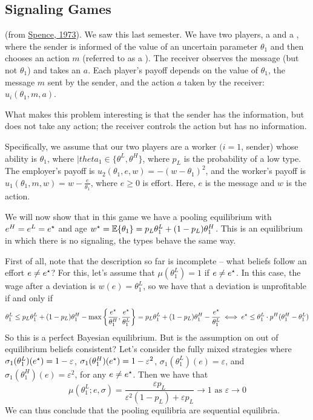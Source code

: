 \documentclass[10pt]{article}
\begin{document}
\subsection{Signaling Games}

\begin{example}
	 (from \href{https://www.jstor.org/stable/1882010}{Spence, 1973}). We saw this last semester. We have two players, a  and a , where the sender is informed of the value of an uncertain parameter $\theta_1$ and then chooses an action $m$ (referred to as a ). The receiver observes the message (but not $\theta_1$) and takes an  $a$. Each player's payoff depends on the value of $\theta_1$, the message $m$ sent by the sender, and the action $a$ taken by the receiver: $u_i(\theta_1,m,a)$. 
	
	\begin{remark}
		What makes this problem interesting is that the sender has the information, but does not take any action; the receiver controls the action but has no information.
	\end{remark}
	
	Specifically, we assume that our two players are a worker $(i=1$, sender) whose ability is $\theta_1$, where $|theta_1 \in \{\theta^L,\theta^H\}$, where $p_L$ is the probability of a low type. The employer's payoff is $u_2(\theta_1,e,w) = -(w-\theta_1)^2$, and the worker's payoff is $u_1(\theta_1,m,w) = w - \frac{e}{\theta_1}$, where $e \ge 0$ is effort. Here, $e$ is the message and $w$ is the action. 
	
	We will now show that in this game we have a pooling equilibrium with $e^H = e^L = e^\star$ and age $w^\star = \mathbb{E}\{\theta_1\} = p_L \theta_1^L + (1-p_L)\theta_1^H$. This is an equilibrium in which there is no signaling, the types behave the same way. 
	
	First of all, note that the description so far is incomplete -- what beliefs follow an effort $e \ne e^\star$? For this, let's assume that $\mu(\theta_1^L) = 1$ if $e \ne e^\star$. In this case, the wage after a deviation is $w(e) =\theta_1^L$, so we have that a deviation is unprofitable if and only if\[\theta_1^L \le p_L\theta_1^L + (1-p_L) \theta_1^H - \max\left\{ \frac{e^\star}{\theta_1^H},\frac{e^\star}{\theta_1^L}\right\} = p_L\theta_1^L + (1-p_L)\theta_1^H - \frac{e^\star}{\theta_1^L} \iff e^\star \le \theta_1^L \cdot p^H (\theta_1^H - \theta_1^L) \]So this is a perfect Bayesian equilibrium. But is the assumption on out of equilibrium beliefs consistent? Let's consider the fully mixed strategies where $\sigma_1(\theta_1^L)(e^\star) = 1-\varepsilon$, $\sigma_1(\theta_1^H)(e^\star) = 1-\varepsilon^2$, $\sigma_1(\theta_1^L)(e) = \varepsilon$, and $\sigma_1(\theta_1^H)(e) = \varepsilon^2$, for any $e \ne e^\star$. Then we have that \[\mu(\theta_1^L ; e,\sigma) = \frac{\varepsilon p_L}{\varepsilon^2 (1-p_L) + \varepsilon p_L} \to 1 \text{ as } \varepsilon\to0\]We can thus conclude that the pooling equilibria are sequential equilibria.
	

\end{example}
\end{document}
